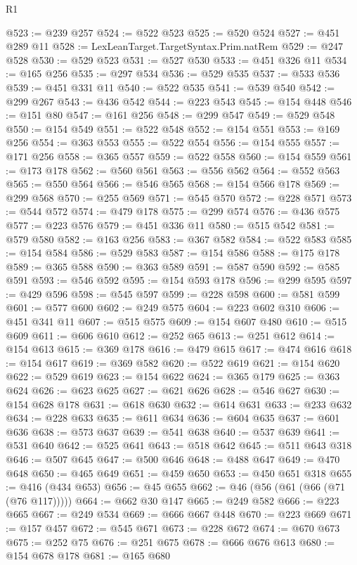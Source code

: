 \begin{lexlean}{R1}
\begin{coremodule}
@523 := @239 @257
@524 := @522 @523
@525 := @520 @524
@527 := @451 @289 @11
@528 := LexLeanTarget.TargetSyntax.Prim.natRem
@529 := @247 @528
@530 := @529 @523
@531 := @527 @530
@533 := @451 @326 @11
@534 := @165 @256
@535 := @297 @534
@536 := @529 @535
@537 := @533 @536
@539 := @451 @331 @11
@540 := @522 @535
@541 := @539 @540
@542 := @299 @267
@543 := @436 @542
@544 := @223 @543
@545 := @154 @448
@546 := @151 @80
@547 := @161 @256
@548 := @299 @547
@549 := @529 @548
@550 := @154 @549
@551 := @522 @548
@552 := @154 @551
@553 := @169 @256
@554 := @363 @553
@555 := @522 @554
@556 := @154 @555
@557 := @171 @256
@558 := @365 @557
@559 := @522 @558
@560 := @154 @559
@561 := @173 @178
@562 := @560 @561
@563 := @556 @562
@564 := @552 @563
@565 := @550 @564
@566 := @546 @565
@568 := @154 @566 @178
@569 := @299 @568
@570 := @255 @569
@571 := @545 @570
@572 := @228 @571
@573 := @544 @572
@574 := @479 @178
@575 := @299 @574
@576 := @436 @575
@577 := @223 @576
@579 := @451 @336 @11
@580 := @515 @542
@581 := @579 @580
@582 := @163 @256
@583 := @367 @582
@584 := @522 @583
@585 := @154 @584
@586 := @529 @583
@587 := @154 @586
@588 := @175 @178
@589 := @365 @588
@590 := @363 @589
@591 := @587 @590
@592 := @585 @591
@593 := @546 @592
@595 := @154 @593 @178
@596 := @299 @595
@597 := @429 @596
@598 := @545 @597
@599 := @228 @598
@600 := @581 @599
@601 := @577 @600
@602 := @249 @575
@604 := @223 @602 @310
@606 := @451 @341 @11
@607 := @515 @575
@609 := @154 @607 @480
@610 := @515 @609
@611 := @606 @610
@612 := @252 @65
@613 := @251 @612
@614 := @154 @613
@615 := @369 @178
@616 := @479 @615
@617 := @474 @616
@618 := @154 @617
@619 := @369 @582
@620 := @522 @619
@621 := @154 @620
@622 := @529 @619
@623 := @154 @622
@624 := @365 @179
@625 := @363 @624
@626 := @623 @625
@627 := @621 @626
@628 := @546 @627
@630 := @154 @628 @178
@631 := @618 @630
@632 := @614 @631
@633 := @233 @632
@634 := @228 @633
@635 := @611 @634
@636 := @604 @635
@637 := @601 @636
@638 := @573 @637
@639 := @541 @638
@640 := @537 @639
@641 := @531 @640
@642 := @525 @641
@643 := @518 @642
@645 := @511 @643 @318
@646 := @507 @645
@647 := @500 @646
@648 := @488 @647
@649 := @470 @648
@650 := @465 @649
@651 := @459 @650
@653 := @450 @651 @318
@655 := @416 (@434 @653)
@656 := @45 @655
@662 := @46 (@56 (@61 (@66 (@71 (@76 @117)))))
@664 := @662 @30 @147
@665 := @249 @582
@666 := @223 @665
@667 := @249 @534
@669 := @666 @667 @448
@670 := @223 @669
@671 := @157 @457
@672 := @545 @671
@673 := @228 @672
@674 := @670 @673
@675 := @252 @75
@676 := @251 @675
@678 := @666 @676 @613
@680 := @154 @678 @178
@681 := @165 @680

\end{coremodule}
\end{lexlean}
